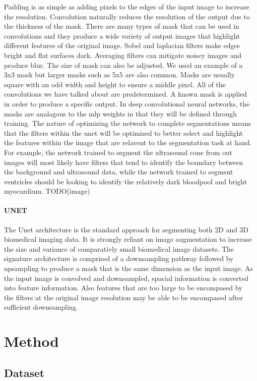 \documentclass{article}
\begin{document}
Padding is as simple as adding pixels to the edges of the input image to increase the resolution.
Convolution naturally reduces the resolution of the output due to the thickness of the mask.
There are many types of mask that can be used in convolutions and they produce a wide variety of output images that highlight different features of the original image.
Sobel and laplacian filters make edges bright and flat surfaces dark. Averaging filters can mitigate noisey images and produce blur.
The size of mask can also be adjusted. We used an example of a 3x3 mask but larger masks such as 5x5 are also common.
Masks are usually square with an odd width and height to ensure a middle pixel. All of the convolutions we have talked about are predetermined.
A known mask is applied in order to produce a specific output. In deep convolutional neural networks, the masks are analagous to the mlp weights in that they will be defined through training.
The nature of optimizing the network to complete segmentations means that the filters within the unet will be optimized to better select and highlight the features within the image that are relavent to the segmentation task at hand.
For example, the network trained to segment the ultrasound cone from out images will most likely have filters that tend to identify the boundary between the background and ultrasound data,
while the network trained to segment ventricles should be looking to identify the relatively dark bloodpool and bright myocardium.
TODO(image)
\paragraph{UNET}
The Unet architecture is the standard approach for segmenting both 2D and 3D biomedical imaging data.
It is strongly reliant on image augmentation to increase the size and variance of comparativly small biomedical image datasets.
The signature architecture is comprised of a downsampling pathway followed by upsampling to produce a mask that is the same dimension as the input image.
As the input image is convolved and downsampled, spacial information is converted into feature information.
Also features that are too large to be encompased by the filters at the original image resolution may be able to be encompased after sufficient downsampling.
\section{Method}
\subsection{Dataset}
\end{document}
